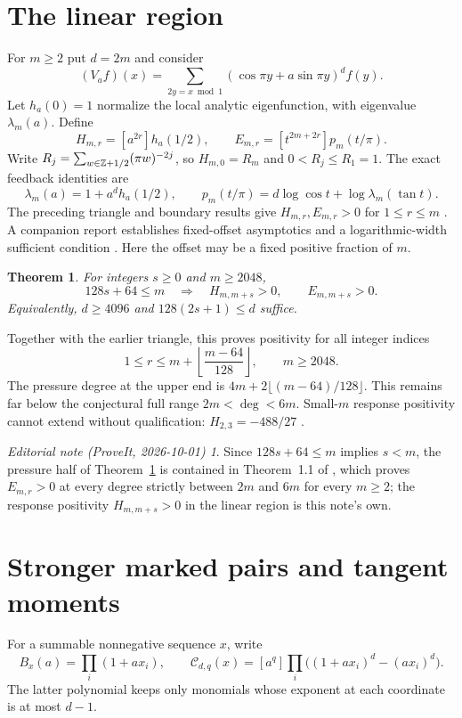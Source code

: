 \documentclass[11pt,a4paper]{article}
\newtheorem{theorem}{Theorem}[section]\newtheorem{lemma}[theorem]{Lemma}\newtheorem{proposition}[theorem]{Proposition}
\theoremstyle{remark}\newtheorem*{ednote}{Editorial note (ProveIt, 2026-10-01)}
\begin{document}
\section{The linear region}
For $m\ge2$ put $d=2m$ and consider
\[
(V_af)(x)=\sum_{2y=x\bmod1}(\cos\pi y+a\sin\pi y)^d f(y).
\]
Let $h_a(0)=1$ normalize the local analytic eigenfunction, with eigenvalue $\lambda_m(a)$. Define
\[
H_{m,r}=[a^{2r}]h_a(1/2),\qquad E_{m,r}=[t^{2m+2r}]p_m(t/\pi).
\]
Write $R_j=\sum_{w\in\mathbb Z+1/2}(\pi w)^{-2j}$, so $H_{m,0}=R_m$ and $0<R_j\le R_1=1$. The exact feedback identities are
\begin{equation}\label{eq:feedback}
\lambda_m(a)=1+a^dh_a(1/2),\qquad p_m(t/\pi)=d\log\cos t+\log\lambda_m(\tan t).
\end{equation}
The preceding triangle and boundary results give $H_{m,r},E_{m,r}>0$ for $1\le r\le m$ \cite{triangle,boundary}. A companion report establishes fixed-offset asymptotics and a logarithmic-width sufficient condition \cite{offset}. Here the offset may be a fixed positive fraction of $m$.
\begin{theorem}\label{thm:main}
For integers $s\ge0$ and $m\ge2048$,
\begin{equation}\label{eq:condition}
128s+64\le m\quad\Longrightarrow\quad H_{m,m+s}>0,\qquad E_{m,m+s}>0.
\end{equation}
Equivalently, $d\ge4096$ and $128(2s+1)\le d$ suffice.
\end{theorem}
Together with the earlier triangle, this proves positivity for all integer indices
\[
1\le r\le m+\left\lfloor\frac{m-64}{128}\right\rfloor,\qquad m\ge2048.
\]
The pressure degree at the upper end is $4m+2\lfloor(m-64)/128\rfloor$. This remains far below the conjectural full range $2m<\deg<6m$. Small-$m$ response positivity cannot extend without qualification: $H_{2,3}=-488/27$ \cite{boundary}.
\begin{ednote}
Since $128s+64\le m$ implies $s<m$, the pressure half of Theorem~\ref{thm:main} is contained in
Theorem~1.1 of , which proves $E_{m,r}>0$ at every degree strictly
between $2m$ and $6m$ for every $m\ge2$; the response positivity $H_{m,m+s}>0$ in the linear
region is this note's own.
\end{ednote}

\section{Stronger marked pairs and tangent moments}
For a summable nonnegative sequence $x$, write
\[
B_x(a)=\prod_i(1+ax_i),\qquad
\mathcal C_{d,q}(x)=[a^q]\prod_i\bigl((1+ax_i)^d-(ax_i)^d\bigr).
\]
The latter polynomial keeps only monomials whose exponent at each coordinate is at most $d-1$.
\end{document}
